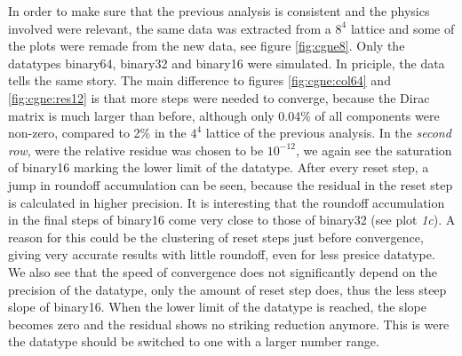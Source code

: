\documentclass{article}
\theoremstyle{plain} %
\theoremstyle{remark} %
\numberwithin{equation}{section}
\begin{document}
In order to make sure that the previous analysis is consistent and the physics involved were relevant, the same data was extracted from a $8^4$ lattice and some of the plots were remade from the new data, see figure \ref{fig:cgne8}. Only the datatypes \gls{binary64}, \gls{binary32} and \gls{binary16} were simulated. In priciple, the data tells the same story. The main difference to figures \ref{fig:cgne:col64} and \ref{fig:cgne:res12} is that more steps were needed to converge, because the Dirac matrix is much larger than before, although only \num{0.04}\% of all components were non-zero, compared to \num{2}\% in the $4^4$ lattice of the previous analysis. In the \textit{second row}, were the relative residue was chosen to be $10^{-12}$, we again see the saturation of \gls{binary16} marking the lower limit of the datatype. After every reset step, a jump in roundoff accumulation can be seen, because the residual in the reset step is calculated in higher precision. It is interesting that the roundoff accumulation in the final steps of \gls{binary16} come very close to those of \gls{binary32} (see plot \textit{1c}). A reason for this could be the clustering of reset steps just before convergence, giving very accurate results with little roundoff, even for less presice datatype. We also see that the speed of convergence does not significantly depend on the precision of the datatype, only the amount of reset step does, thus the less steep slope of \gls{binary16}. When the lower limit of the datatype is reached, the slope becomes zero and the residual shows no striking reduction anymore. This is were the datatype should be switched to one with a larger number range.
\end{document}

